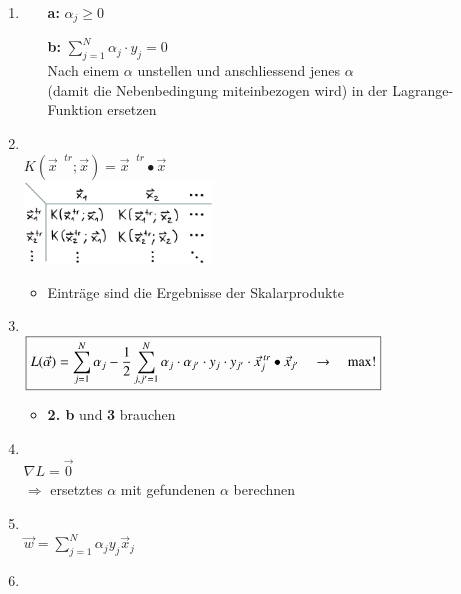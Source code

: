 \begin{enumerate}
    \item {}
    \begin{itemize}
        \item [\textbf{a:}] $\boxed{\alpha_j\geq0}$
        \item [\textbf{b:}] $\boxed{\sum_{j=1}^N\alpha_j \cdot y_j=0}$\\
        Nach einem $\alpha$ unstellen und anschliessend jenes $\alpha$\\(damit die Nebenbedingung miteinbezogen wird) in der Lagrange-Funktion ersetzen
    \end{itemize}
    \item {}\\
        $\boxed{K\left( \vec{x}^{\text{ $tr$}} ; \vec{x}\right) = \vec{x}^{\text{ $tr$}} \bullet \vec{x}}$\\
        \includegraphics[width=5cm]{images/kernel_matrix.png}
        \begin{itemize}
            \item Einträge sind die Ergebnisse der Skalarprodukte
        \end{itemize}
    \item {}\\
        $\boxed{L(\vec{\alpha})=\sum_{j=1}^N\alpha_j-\frac{1}{2}\sum_{j,j'=1}^N\alpha_j \cdot \alpha_{j'} \cdot \space y_j \cdot y_{j'} \cdot \space \vec{x}_j^{\text{ $tr$}} \bullet  \vec{x}_{j'}\quad\to\quad\max!}$
        \begin{itemize}
            \item \textbf{2. b} und \textbf{3} brauchen
        \end{itemize}
    \item {}\\
            $\boxed{\nabla L = \vec{0}}$\\
            $\Rightarrow$ ersetztes $\alpha$ mit gefundenen $\alpha$ berechnen 
    \item {}\\
        $\boxed{\vec{w}=\sum_{j=1}^N\alpha_jy_j\vec{x}_j}$
    \item {}\\

\end{enumerate}
